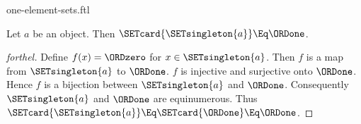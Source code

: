 \documentclass{stex}
\begin{document}
\begin{smodule}{one-element-sets.ftl}

\begin{proposition}[forthel,id=SET_THEORY_07_836893598023680]
  Let $a$ be an object.
  Then $\SETcard{\SETsingleton{a}} \Eq \ORDone$.
\end{proposition}
\begin{proof}[forthel]
  Define $f(x) = \ORDzero$ for $x \in \SETsingleton{a}$.
  Then $f$ is a map from $\SETsingleton{a}$ to $\ORDone$.
  $f$ is injective and surjective onto $\ORDone$.
  Hence $f$ is a bijection between $\SETsingleton{a}$ and $\ORDone$.
  Consequently $\SETsingleton{a}$ and $\ORDone$ are equinumerous.
  Thus $\SETcard{\SETsingleton{a}} \Eq \SETcard{\ORDone} \Eq \ORDone$.
\end{proof}
\end{smodule}
\end{document}
